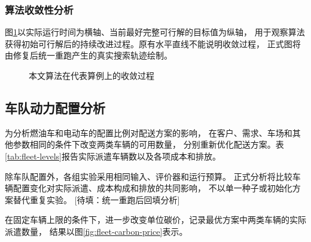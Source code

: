 \documentclass{setp-new}
\DeclareRobustCommand{\TBD}[1]{%
  \begingroup\setlength{\fboxsep}{1.2pt}%
  \colorbox{black!12}{\textcolor{black!65}{\textsf{\footnotesize[待填：#1]}}}%
  \endgroup}
\begin{document}
\subsubsection{算法收敛性分析}

图\ref{fig:convergence}以实际运行时间为横轴、当前最好完整可行解的目标值为纵轴，
用于观察算法获得初始可行解后的持续改进过程。原有水平直线不能说明收敛过程，
正式图将由修复后统一重跑产生的真实搜索轨迹绘制。

\begin{figure}[H]
  \centering
  \fbox{\parbox[c][3.8cm][c]{0.86\textwidth}{\centering
  \TBD{按真实运行时间绘制算法收敛曲线}}}
  \caption{本文算法在代表算例上的收敛过程}
  \label{fig:convergence}
\end{figure}

\subsection{车队动力配置分析}

为分析燃油车和电动车的配置比例对配送方案的影响，
在客户、需求、车场和其他参数相同的条件下改变两类车辆的可用数量，
分别重新优化配送方案。表\ref{tab:fleet-levels}报告实际派遣车辆数以及各项成本和排放。

\begin{table}[H]
  \centering
  \caption{车队动力配置分析结果}
  \label{tab:fleet-levels}
  \scriptsize
\end{table}

除车队配置外，各组实验采用相同输入、评价器和运行预算。
正式分析将比较车辆配置变化对实际派遣、成本构成和排放的共同影响，
不以单一种子或初始化方案替代重复实验。\TBD{统一重跑后回填分析}

在固定车辆上限的条件下，进一步改变单位碳价，记录最优方案中两类车辆的实际派遣数量，
结果以图\ref{fig:fleet-carbon-price}表示。
\end{document}
